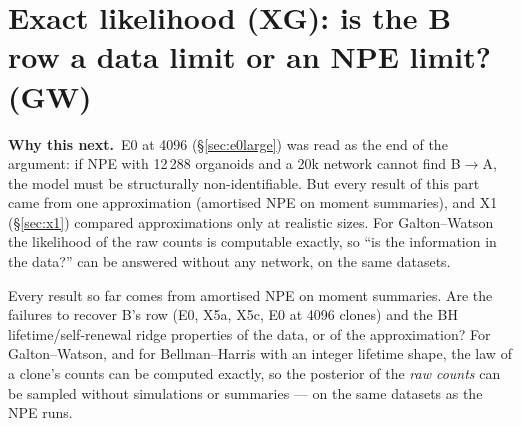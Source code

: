 \documentclass[10pt,a4paper]{article}
\newcommand{\blk}[1]{\par\needspace{5\baselineskip}\smallskip{\sffamily\bfseries\color{inkgray}#1}\par}
\newcommand{\Q}{\blk{Question}}
\newcommand{\Setup}{\blk{Setup}}
\newcommand{\Why}[1]{\begin{whybox}{\sffamily\bfseries\color{cblue}Why this next.}\ #1\end{whybox}}
\renewcommand{\blk}[1]{\par\Needspace*{5\baselineskip}\smallskip{\sffamily\bfseries\color{inkgray}#1}\par}
\newcommand{\expsec}[2]{\Needspace*{18\baselineskip}\section{#1}\label{#2}}
\newcommand{\sref}[1]{\S\ref{#1}}
\begin{document}
\expsec{Exact likelihood (XG): is the B row a data limit or an NPE limit? (GW)}{sec:exact}
\Why{E0 at 4096 (\sref{sec:e0large}) was read as the end of the argument: if NPE with 12\,288 organoids and a 20k network cannot find B$\to$A, the model must be structurally non-identifiable. But every result of this part came from one approximation (amortised NPE on moment summaries), and X1 (\sref{sec:x1}) compared approximations only at realistic sizes. For Galton--Watson the likelihood of the raw counts is computable exactly, so ``is the information in the data?'' can be answered without any network, on the same datasets.}
\Q Every result so far comes from amortised NPE on moment summaries. Are the failures to recover B's row (E0, X5a, X5c, E0 at 4096 clones) and the BH lifetime/self-renewal ridge properties of the data, or of the approximation? For Galton--Watson, and for Bellman--Harris with an integer lifetime shape, the law of a clone's counts can be computed exactly, so the posterior of the \emph{raw counts} can be sampled without simulations or summaries --- on the same datasets as the NPE runs.
\Setup
\end{document}
